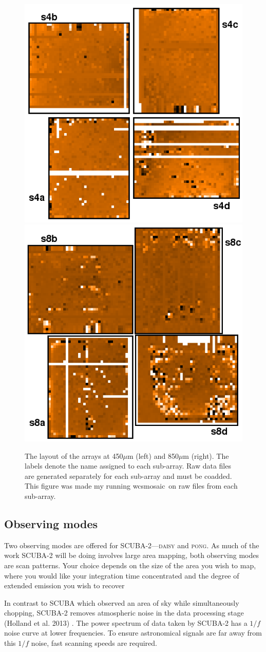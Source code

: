 \documentclass[twoside,11pt]{article}
\newcommand{\xref}[3]{#1}
\newcommand{\xlabel}[1]{}
\renewcommand{\_}{\texttt{\symbol{95}}}
\newcommand{\task}[1]{\textsf{#1}}
\newcommand{\wcsmosaic}{\xref{\task{wcsmosaic}}{sun95}{WCSMOSAIC}}
\begin{document}
\begin{figure}[t!]
\begin{center}
\includegraphics[width=0.4\linewidth]{sc21_450array}
\hspace{1cm}
\includegraphics[width=0.4\linewidth]{sc21_850array}
\label{fig:arrays}
\caption{\small The layout of the arrays at 450$\mu$m (left) and
850$\mu$m (right). The labels denote the name assigned to each
sub-array. Raw data files are generated separately for each sub-array
and must be coadded. This figure was made my running \wcsmosaic\ on
raw files from each sub-array.}
\end{center}
\end{figure}

\subsection{\xlabel{obs_modes}Observing modes}
\label{sec:mmodes}

Two observing modes are offered for SCUBA-2---\textsc{daisy} and
\textsc{pong}. As much of the work SCUBA-2 will be doing involves
large area mapping, both observing modes are scan patterns. Your
choice depends on the size of the area you wish to map, where you
would like your integration time concentrated and the degree of
extended emission you wish to recover

In contrast to SCUBA which observed an area of sky while
simultaneously chopping, SCUBA-2 removes atmospheric noise in the data
processing stage (Holland et al. 2013) \cite{s2main}. The power spectrum
of data taken by SCUBA-2 has a $1/f$ noise curve at lower frequencies. To
ensure astronomical signals are far away from this $1/f$ noise, fast
scanning speeds are required.
\end{document}
